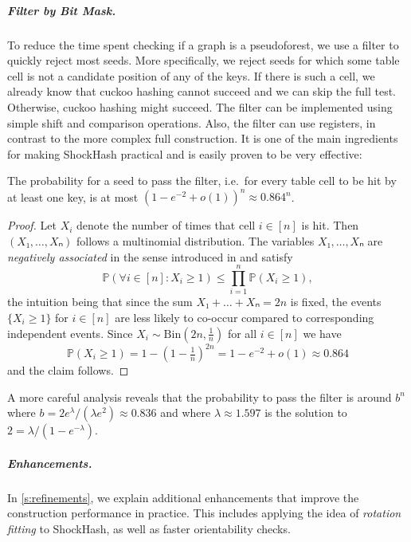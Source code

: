 \documentclass[a4paper,USenglish,cleveref]{lipics-v2021}
\newcommand{\myparagraph}[1]{\subparagraph*{#1}}
\newcommand{\Bin}{\mathrm{Bin}}
\begin{document}
\myparagraph{Filter by Bit Mask.}\label{s:bitmaskFilter}
To reduce the time spent checking if a graph is a pseudoforest, we use a filter to quickly reject most seeds.
More specifically, we reject seeds for which some table cell is not a candidate position of any of the keys.
If there is such a cell, we already know that cuckoo hashing cannot succeed and we can skip the full test.
Otherwise, cuckoo hashing might succeed.
The filter can be implemented using simple shift and comparison operations.
Also, the filter can use registers, in contrast to the more complex full construction.
It is one of the main ingredients for making ShockHash practical and is easily proven to be very effective:

\begin{lemma}
  \label{lem:filterProbability}
  The probability for a seed to pass the filter, i.e.\ for every table cell to be hit by at least one key, is at most $(1-e^{-2}+o(1))^n ≈ 0.864^n$.
\end{lemma}
\begin{proof}
  Let $X_i$ denote the number of times that cell $i ∈ [n]$ is hit. Then $(X₁,…,Xₙ)$ follows a multinomial distribution.
  The variables $X₁,…,Xₙ$ are \emph{negatively associated} in the sense introduced in \cite{JDP:NegativeAssociation:1983} and satisfy
  \[
    ℙ(∀i∈[n]:X_i ≥ 1) ≤ \prod_{i = 1}^n ℙ(X_i ≥
    1),
  \]
  the intuition being that since the sum $X₁+…+Xₙ= 2n$ is fixed, the events $\{X_i ≥ 1\}$ for $i ∈ [n]$ are less likely to co-occur compared to corresponding independent events.
  Since $X_i \sim \Bin(2n,\frac 1n)$ for all $i ∈ [n]$ we have
  \[
    ℙ(X_i ≥ 1) = 1- (1-\tfrac 1n)^{2n} = 1-e^{-2}
    + o(1) ≈ 0.864
  \]
  and the claim follows.
  \hfill
\end{proof}
A more careful analysis \cite{walzer2024probability} reveals that the probability to pass the filter is around $b^n$ where $b = 2e^λ / (λe^2) ≈ 0.836$ and where $λ ≈ 1.597$ is the solution to $2 = λ/(1-e^{-λ})$.

\myparagraph{Enhancements.}
In \cref{s:refinements}, we explain additional enhancements that improve the construction performance in practice.
This includes applying the idea of \emph{rotation fitting} \cite{bez2023high} to ShockHash, as well as faster orientability checks.
\end{document}
